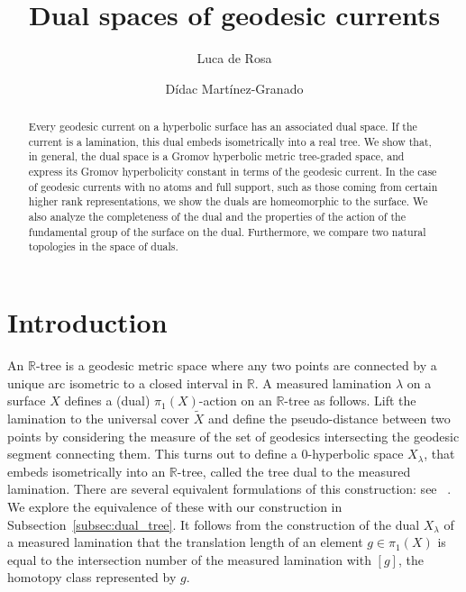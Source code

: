 \documentclass[12pt,article]{amsart}
\numberwithin{equation}{section}
\numberwithin{figure}{section}
\theoremstyle{definition}
\theoremstyle{plain}
\newcommand*{\wt}[1]{\widetilde{#1}}
\begin{document}
\title{Dual spaces of geodesic currents}

\author[De Rosa]{Luca de Rosa}
\address{
Department of Mathematics\\
         ETH Zurich\\
R\"amistrasse 101, 8092 Zurich\\
Switzerland}

\author[Martínez-Granado]{Dídac Martínez-Granado}
\address{Department of Mathematics\\University of Luxembourg\\Av. de la Fonte 6, Esch-sur-Alzette, L-4364, Luxembourg}       



\begin{abstract}
Every geodesic current on a hyperbolic surface has an associated dual space. If the current is a lamination, this dual embeds isometrically into a real tree. We show that, in general, the dual space is a Gromov hyperbolic metric tree-graded space, and express its Gromov hyperbolicity constant in terms of the geodesic current.  In the case of geodesic currents with no atoms and full support, such as those coming from certain higher rank representations, we show the duals are homeomorphic to the surface.
We also analyze the completeness of the dual and the properties of the action of the fundamental group of the surface on the dual. 
Furthermore, we compare two natural topologies in the space of duals. 

\end{abstract}
\maketitle
\tableofcontents

\section{Introduction}
\label{sec:intro}
An $\mathbb{R}$-tree is a geodesic metric space where any two points are connected by a unique arc isometric to a closed interval in $\mathbb{R}$.
A measured lamination $\lambda$ on a surface $X$ defines a (dual) $\pi_1(X)$-action on an $\mathbb{R}$-tree as follows. Lift the lamination to the universal cover $\wt{X}$ and define the pseudo-distance between two points by considering the measure of the set of geodesics intersecting the geodesic segment connecting them.
This turns out to define a $0$-hyperbolic space $X_{\lambda}$, that embeds isometrically into an $\mathbb{R}$-tree, called the tree dual to the measured lamination.
There are several equivalent formulations of this construction: see ~\cite{MORGAN1991143,W98:Duals,Kap00:Kapovich2000HyperbolicMA}. We explore the equivalence of these with our construction in Subsection~\ref{subsec:dual_tree}.
It follows from the construction of the dual $X_{\lambda}$ of a measured lamination that the translation length of an element $g \in \pi_1(X)$ is equal to the intersection number of the measured lamination with $[g]$, the homotopy class represented by $g$.
\end{document}

